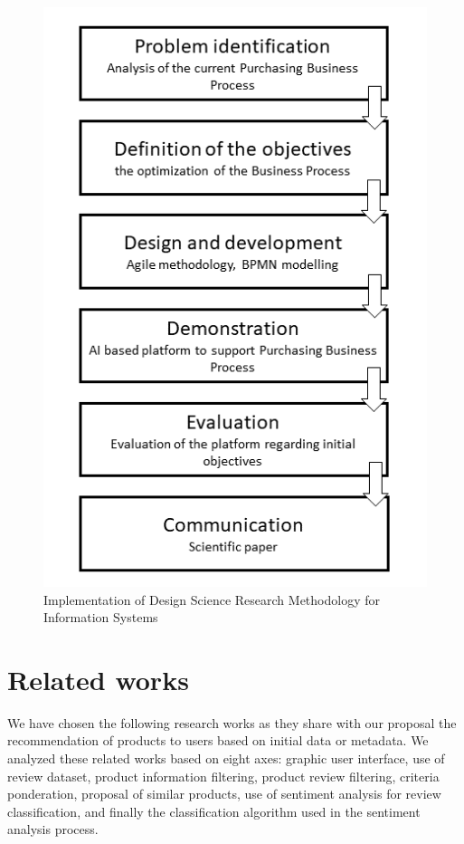 \documentclass[preprint,3p,onecolumn]{elsarticle}
\begin{document}
\begin{figure}[H]
\centering
\includegraphics[scale=.5]{rdm}
\caption{Implementation of Design Science Research Methodology for Information Systems}
\label{rdm}
\end{figure}


\section{Related works}
\par We have chosen the following research works as they share with our proposal the recommendation of products to users based on initial data or metadata. We analyzed these related works based on eight axes: graphic user interface, use of review dataset, product information filtering, product review filtering, criteria ponderation, proposal of similar products, use of sentiment analysis for review classification, and finally the classification algorithm used in the sentiment analysis process. 
\end{document}
